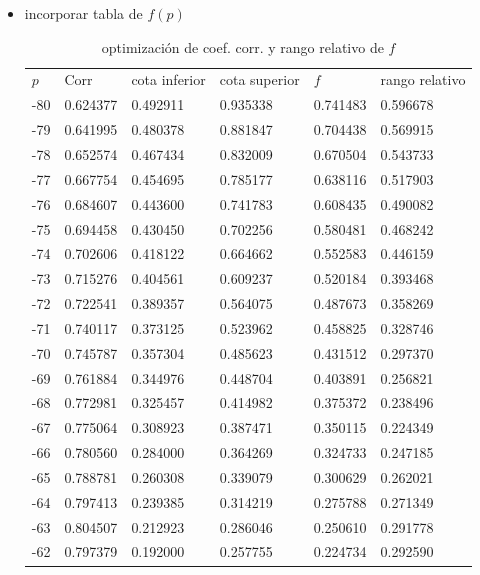 \begin{itemize}
\item incorporar tabla de $f(p)$
\begin{table}[]
\centering
\caption{optimización de coef. corr. y rango relativo de $f$}
\label{tab:opt}
\begin{tabular}{llllll}
$p$   & Corr     & cota inferior & cota superior & $f$        & rango relativo \\
-80 & 0.624377 & 0.492911      & 0.935338      & 0.741483 & 0.596678       \\
-79 & 0.641995 & 0.480378      & 0.881847      & 0.704438 & 0.569915       \\
-78 & 0.652574 & 0.467434      & 0.832009      & 0.670504 & 0.543733       \\
-77 & 0.667754 & 0.454695      & 0.785177      & 0.638116 & 0.517903       \\
-76 & 0.684607 & 0.443600      & 0.741783      & 0.608435 & 0.490082       \\
-75 & 0.694458 & 0.430450      & 0.702256      & 0.580481 & 0.468242       \\
-74 & 0.702606 & 0.418122      & 0.664662      & 0.552583 & 0.446159       \\
-73 & 0.715276 & 0.404561      & 0.609237      & 0.520184 & 0.393468       \\
-72 & 0.722541 & 0.389357      & 0.564075      & 0.487673 & 0.358269       \\
-71 & 0.740117 & 0.373125      & 0.523962      & 0.458825 & 0.328746       \\
-70 & 0.745787 & 0.357304      & 0.485623      & 0.431512 & 0.297370       \\
-69 & 0.761884 & 0.344976      & 0.448704      & 0.403891 & 0.256821       \\
-68 & 0.772981 & 0.325457      & 0.414982      & 0.375372 & 0.238496       \\
-67 & 0.775064 & 0.308923      & 0.387471      & 0.350115 & 0.224349       \\
-66 & 0.780560 & 0.284000      & 0.364269      & 0.324733 & 0.247185       \\
-65 & 0.788781 & 0.260308      & 0.339079      & 0.300629 & 0.262021       \\
-64 & 0.797413 & 0.239385      & 0.314219      & 0.275788 & 0.271349       \\
-63 & 0.804507 & 0.212923      & 0.286046      & 0.250610 & 0.291778       \\
-62 & 0.797379 & 0.192000      & 0.257755      & 0.224734 & 0.292590       \\

\end{tabular}
\end{table}
\end{itemize}
